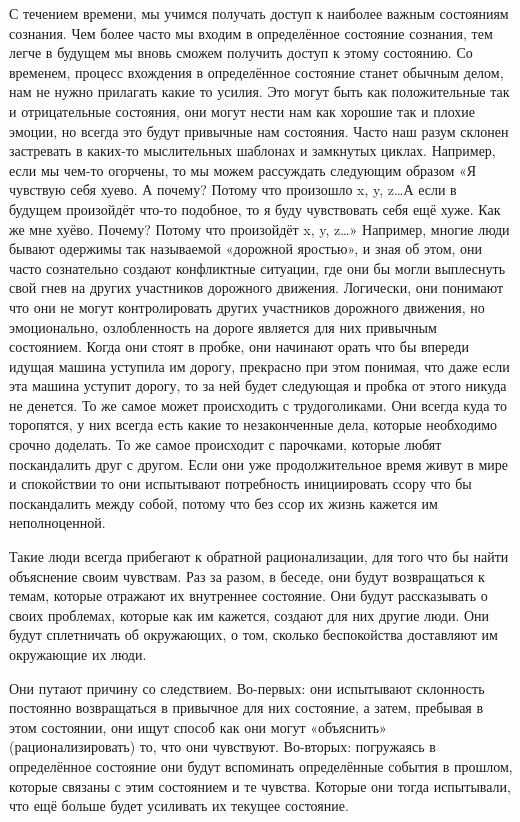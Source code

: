 С течением времени, мы учимся получать доступ к наиболее важным состояниям сознания. Чем более часто мы входим в определённое состояние сознания, тем легче в будущем мы вновь сможем получить доступ к этому состоянию. Со временем, процесс вхождения в определённое состояние станет обычным делом, нам не нужно прилагать какие то усилия. Это могут быть как положительные так и отрицательные состояния, они могут нести нам как хорошие так и плохие эмоции, но всегда это будут привычные нам состояния. Часто наш разум склонен застревать в каких-то мыслительных шаблонах и замкнутых циклах. Например, если мы чем-то огорчены, то мы можем рассуждать следующим образом «Я чувствую себя хуево. А почему? Потому что произошло x, y, z\ldots А если в будущем произойдёт что-то подобное, то я буду чувствовать себя ещё хуже. Как же мне хуёво. Почему? Потому что произойдёт x, y, z\ldots» Например, многие люди бывают одержимы так называемой «дорожной яростью», и зная об этом, они часто сознательно создают конфликтные ситуации, где они бы могли выплеснуть свой гнев на других участников дорожного движения. Логически, они понимают что они не могут контролировать других участников дорожного движения, но эмоционально, озлобленность на дороге является для них привычным состоянием. Когда они стоят в пробке, они начинают орать что бы впереди идущая машина уступила им дорогу, прекрасно при этом понимая, что даже если эта машина уступит дорогу, то за ней будет следующая и пробка от этого никуда не денется. То же самое может происходить с трудоголиками. Они всегда куда то торопятся, у них всегда есть какие то незаконченные дела, которые необходимо срочно доделать. То же самое происходит с парочками, которые любят поскандалить друг с другом. Если они уже продолжительное время живут в мире и спокойствии то они испытывают потребность инициировать ссору что бы поскандалить между собой, потому что без ссор их жизнь кажется им неполноценной.

Такие люди всегда прибегают к обратной рационализации, для того что бы найти объяснение своим чувствам. Раз за разом, в беседе, они будут возвращаться к темам, которые отражают их внутреннее состояние. Они будут рассказывать о своих проблемах, которые как им кажется, создают для них другие люди. Они будут сплетничать об окружающих, о том, сколько беспокойства доставляют им окружающие их люди.

Они путают причину со следствием. Во-первых: они испытывают склонность постоянно возвращаться в привычное для них состояние, а затем, пребывая в этом состоянии, они ищут способ как они могут «объяснить» (рационализировать) то, что они чувствуют. Во-вторых: погружаясь в определённое состояние они будут вспоминать определённые события в прошлом, которые связаны с этим состоянием и те чувства. Которые они тогда испытывали, что ещё больше будет усиливать их текущее состояние.

